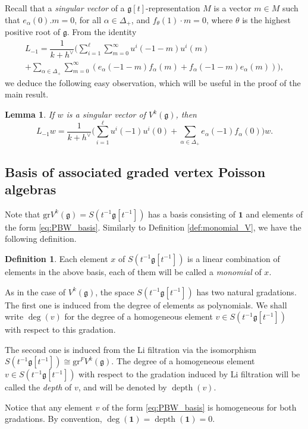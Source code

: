 \documentclass[11pt]{article}
\numberwithin{equation}{section}
\let\oldvee\vee
\renewcommand{\vee}{{\scriptscriptstyle\oldvee}}
\let\al\alpha
\DeclareMathOperator{\dep}{depth}
\newcommand \g{\mathfrak g}
\newcommand\gr{\mathrm{gr}V^{k}({\mathfrak g})}
\newtheorem{lem}[theorem]{Lemma}
\theoremstyle{definition}
\newtheorem{defn}[theorem]{Definition}
\begin{document}
Recall that a \emph{singular vector} of a $\g[t]$-representation $M$
is a vector $m \in M$
such that $e_{\alpha}(0).m=0$, for all $\alpha \in {\Delta}_{+}$,
and $f_\theta(1)\cdot m=0$, where $\theta$ is the highest positive root of $\g$.
From the identity
\begin{multline*}
L_{-1}=
\dfrac{1}{k+h^\vee} \biggl(\sum_{i=1}^{\ell}\sum_{m=0}^{\infty} u^i(-1-m) u^i(m)\\[-8pt]
+\sum_{\al\in{\Delta}_{+}}\sum_{m=0}^{\infty}
(e_{\al}(-1-m)f_{\al}(m)+f_{\al}(-1-m)e_{\al}(m))\biggr),
\end{multline*}
we deduce the following easy observation, which will be useful
in the proof of the main result.

\begin{lem}
\label{lem:Sugawara_singular_vector}
If $w$ is a singular vector of $V^k(\g)$,
then
\[
L_{-1} w=\dfrac{1}{k+h^\vee} \biggl(\sum_{i=1}^{\ell}u^i(-1)u^i(0)
+\sum_{\al\in{\Delta}_{+}}e_{\al}(-1)f_{\al}(0)\biggr) w.
\]
\end{lem}
\subsection{Basis of associated graded vertex Poisson algebras}

Note that $\gr=S(t^{-1}\g[t^{-1}])$ has a basis consisting
of $\mathbf{1}$ and elements of the form \eqref{eq:PBW_basis}.
Similarly to Definition \ref{def:monomial_V}, we have the following
definition.

\begin{defn}
\label{def:monomial_S}
Each element $x$ of $S(t^{-1}\g[t^{-1}])$
is a linear combination of elements in the above basis,
each of them will be called a \emph{monomial} of $x$.
\end{defn}

{As in the case of $V^k(\g)$,}
the space $S(t^{-1}\g[t^{-1}])$ has two natural gradations.
The first one is induced from the degree of elements as
polynomials.
We shall write $\deg(v)$ for the degree of a homogeneous
element $v \in S(t^{-1}\g[t^{-1}])$ with respect to this gradation.

The second one is induced from the Li filtration via the isomorphism
$S(t^{-1}\g[t^{-1}]) \cong \mathrm{gr}^F V^k(\g)$.
The degree of a homogeneous
element $v \in S(t^{-1}\g[t^{-1}])$ with respect to the gradation
induced by Li filtration
will be called the \emph{depth} of $v$, and will be denoted by $\dep(v)$.

Notice that any element $v$ of the form \eqref{eq:PBW_basis} is homogeneous
for both gradations.
By convention, $\deg(\mathbf{1})=\dep(\mathbf{1})=0$.
\end{document}
